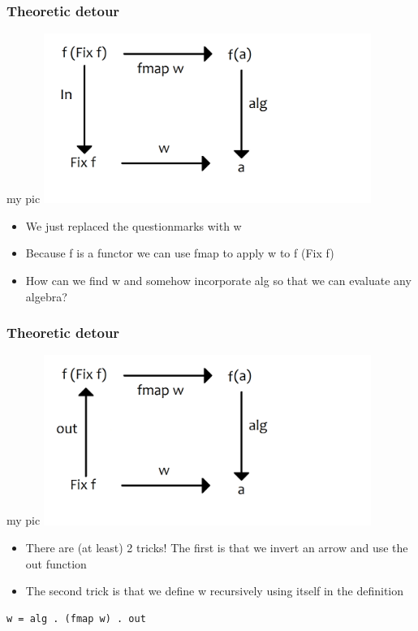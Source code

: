 \documentclass[10pt]{beamer}
\begin{document}
\begin{frame}[fragile]
\frametitle{Theoretic detour}

\begin{block}{my pic}
\includegraphics[width=0.8\textwidth]{graf3.png}	
\end{block}
\begin{itemize}
\item We just replaced the questionmarks with w
\item Because f is a functor we can use fmap to apply w to f (Fix f)	
\item How can we find w and somehow incorporate alg so that we can evaluate any algebra? 	
\end{itemize}

\end{frame}





\begin{frame}[fragile]
\frametitle{Theoretic detour}

\begin{block}{my pic}
\includegraphics[width=0.8\textwidth]{graf4.png}	
\end{block}
\begin{itemize}
\item There are (at least) 2 tricks! The first is that we invert an arrow and use the out function
\item The second trick is that we define w recursively using itself in the definition	
\end{itemize}

\begin{lstlisting}
w = alg . (fmap w) . out
\end{lstlisting}

\end{frame}
\end{document}
